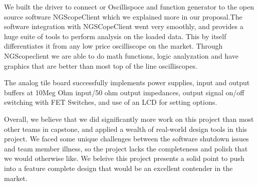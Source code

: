 We built the driver to connect or Oscillispoce and function generator to the open source software NGScopeClient which we explained more in our proposal.The software integration with NGSCopeClient went very smoothly, and provides a huge suite of tools to perform analysis on the loaded data. This by itself differentiates it from any low price oscilliscope on the market. Through NGScopeclient we are able to do math functions, logic analyzation and have graphics that are better than most top of the line oscilliscopes.

The analog tile board successfully implements power supplies, input and output buffers at 10Meg Ohm input/50 ohm output impedances, output signal on/off switching with FET Switches, and use of an LCD for setting options.

Overall, we believe that we did significantly more work on this project than most other teams in capstone, and applied a wealth of real-world design tools in this project. We faced some unique challenges between the software shutdown issues and team member illness, so the project lacks the completeness and polish that we would otherwise like. We beleive this project presents a solid point to push into a feature complete design that would be an excellent contender in the market.